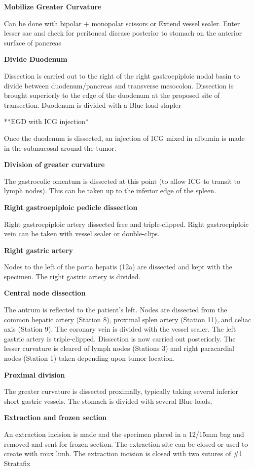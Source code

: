 \documentclass[
  letterpaper,
]{scrbook}
\begin{document}
\textbf{Mobilize Greater Curvature}

Can be done with bipolar + monopolar scissors or Extend vessel sealer.
Enter lesser sac and check for peritoneal disease posterior to stomach
on the anterior surface of pancreas

\textbf{Divide Duodenum}

Dissection is carried out to the right of the right gastroepiploic nodal
basin to divide between duodenum/pancreas and transverse mesocolon.
Dissection is brought superiorly to the edge of the duodenum at the
proposed site of transection. Duodenum is divided with a Blue load
stapler

**EGD with ICG injection*

Once the duodenum is dissected, an injection of ICG mixed in albumin is
made in the submucosal around the tumor.

\textbf{Division of greater curvature}

The gastrocolic omentum is dissected at this point (to allow ICG to
transit to lymph nodes). This can be taken up to the inferior edge of
the spleen.

\textbf{Right gastroepiploic pedicle dissection}

Right gastroepiploic artery dissected free and triple-clipped. Right
gastroepiploic vein can be taken with vessel sealer or double-clips.

\textbf{Right gastric artery}

Nodes to the left of the porta hepatis (12a) are dissected and kept with
the specimen. The right gastric artery is divided.

\textbf{Central node dissection}

The antrum is reflected to the patient's left. Nodes are dissected from
the common hepatic artery (Station 8), proximal splen artery (Station
11), and celiac axis (Station 9). The coronary vein is divided with the
vessel sealer. The left gastric artery is triple-clipped. Dissection is
now carried out posteriorly. The lesser curvature is cleared of lymph
nodes (Stations 3) and right paracardial nodes (Station 1) taken
depending upon tumor location.

\textbf{Proximal division}

The greater curvature is dissected proximally, typically taking several
inferior short gastric vessels. The stomach is divided with several Blue
loads.

\textbf{Extraction and frozen section}

An extraction incision is made and the specimen placed in a 12/15mm bag
and removed and sent for frozen section. The extraction site can be
closed or used to create with roux limb. The extraction incision is
closed with two sutures of \#1 Stratafix
\end{document}
